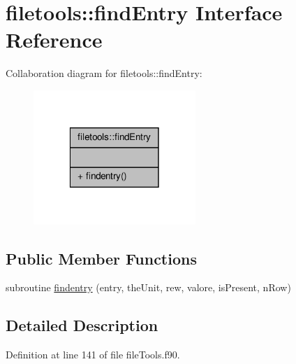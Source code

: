 \hypertarget{interfacefiletools_1_1find_entry}{\section{filetools\-:\-:find\-Entry Interface Reference}
\label{interfacefiletools_1_1find_entry}
}


Collaboration diagram for filetools\-:\-:find\-Entry\-:\nopagebreak
\begin{figure}[H]
\begin{center}
\leavevmode
\includegraphics[width=174pt]{interfacefiletools_1_1find_entry__coll__graph}
\end{center}
\end{figure}
\subsection*{Public Member Functions}
\begin{DoxyCompactItemize}
\item 
subroutine \hyperlink{interfacefiletools_1_1find_entry_a850f330e19410327017ded432bedab00}{findentry} (entry, the\-Unit, rew, valore, is\-Present, n\-Row)
\end{DoxyCompactItemize}


\subsection{Detailed Description}


Definition at line 141 of file file\-Tools.\-f90.



